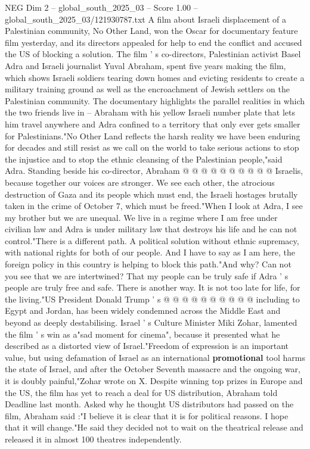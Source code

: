 \begin{textsample}{NEG Dim 2 – global\_south\_2025\_03 – Score 1.00 – global\_south\_2025\_03/121930787.txt}  \label{ex:f2_neg_147}
A film about Israeli displacement of a Palestinian community, No Other Land, won the Oscar for documentary feature film yesterday, and its directors appealed for help to end the conflict and accused the US of blocking a solution.
The film ' s co-directors, Palestinian activist Basel Adra and Israeli journalist Yuval Abraham, spent five years making the film, which shows Israeli soldiers tearing down homes and evicting residents to create a military training ground as well as the encroachment of Jewish settlers on the Palestinian community.
The documentary highlights the parallel realities in which the two friends live in -- Abraham with his yellow Israeli number plate that lets him travel anywhere and Adra confined to a territory that only ever gets smaller for Palestinians."No Other Land reflects the harsh reality we have been enduring for decades and still resist as we call on the world to take serious actions to stop the injustice and to stop the ethnic cleansing of the Palestinian people,"said Adra.
Standing beside his co-director, Abraham @ @ @ @ @ @ @ @ @ @ Israelis, because together our voices are stronger.
We see each other, the atrocious destruction of Gaza and its people which must end, the Israeli hostages brutally taken in the crime of October 7, which must be freed."When I look at Adra, I see my brother but we are unequal.
We live in a regime where I am free under civilian law and Adra is under military law that destroys his life and he can not control."There is a different path.
A political solution without ethnic supremacy, with national rights for both of our people.
And I have to say as I am here, the foreign policy in this country is helping to block this path."And why?
Can not you see that we are intertwined?
That my people can be truly safe if Adra ' s people are truly free and safe.
There is another way.
It is not too late for life, for the living."US President Donald Trump ' s @ @ @ @ @ @ @ @ @ @ including to Egypt and Jordan, has been widely condemned across the Middle East and beyond as deeply destabilising.
Israel ' s Culture Minister Miki Zohar, lamented the film ' s win as a"sad moment for cinema", because it presented what he described as a distorted view of Israel."Freedom of expression is an important value, but using defamation of Israel as an international \textbf{promotional} tool harms the state of Israel, and after the October Seventh massacre and the ongoing war, it is doubly painful,"Zohar wrote on X.
Despite winning top prizes in Europe and the US, the film has yet to reach a deal for US distribution, Abraham told Deadline last month.
Asked why he thought US distributors had passed on the film, Abraham said :"I believe it is clear that it is for political reasons.
I hope that it will change."He said they decided not to wait on the theatrical release and released it in almost 100 theatres independently.

\end{textsample}
